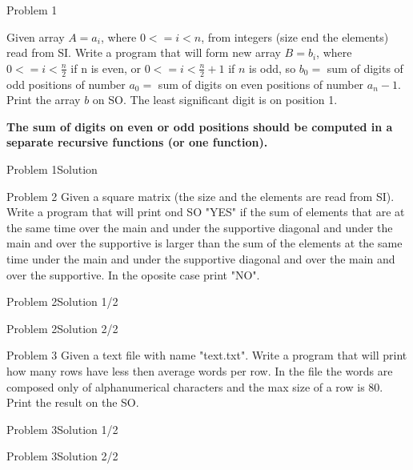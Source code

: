 
\begin{frame}{Problem 1}
\begin{scriptsize}
Given array $A = { a_i }$, where $0 <= i < n$, from integers (size end the elements) read from SI.
Write a program that will form new array $B = { b_i }$, where $0 <= i < \frac{n}{2}$ if n is even, or 
$0 <= i < \frac{n}{2} + 1$ if $n$ is odd, so $b_0 = $ sum of digits of odd positions of number $a_0 = $ sum of digits on even positions of number $a_n-1$. Print the array $b$ on SO.
The least significant digit is on position 1. 

\textbf{The sum of digits on even or odd positions should be computed
in a separate recursive functions (or one function).}
\end{scriptsize}
\end{frame}

\begin{frame}[fragile]{Problem 1}{Solution}

\end{frame}

\begin{frame}{Problem 2}
Given a square matrix (the size and the elements are read from SI).
Write a program that will print ond SO "YES" if the sum of elements that are at 
the same time over the main and under the supportive diagonal and under the main and over the
supportive is larger than the sum of
the elements at the same time under the main and under the supportive diagonal and over the main and over
the supportive. In the oposite case print "NO".
\end{frame}

\begin{frame}[fragile]{Problem 2}{Solution 1/2}

\end{frame}

\begin{frame}[fragile]{Problem 2}{Solution 2/2}

\end{frame}

\begin{frame}{Problem 3}
Given a text file with name "text.txt". Write a program that will print 
how many rows have less then average words per row. In the file the words are composed only of alphanumerical characters and
the max size of a row is 80. Print the result on the SO.
\end{frame}

\begin{frame}[fragile]{Problem 3}{Solution 1/2}

\end{frame}

\begin{frame}[fragile]{Problem 3}{Solution 2/2}

\end{frame}

